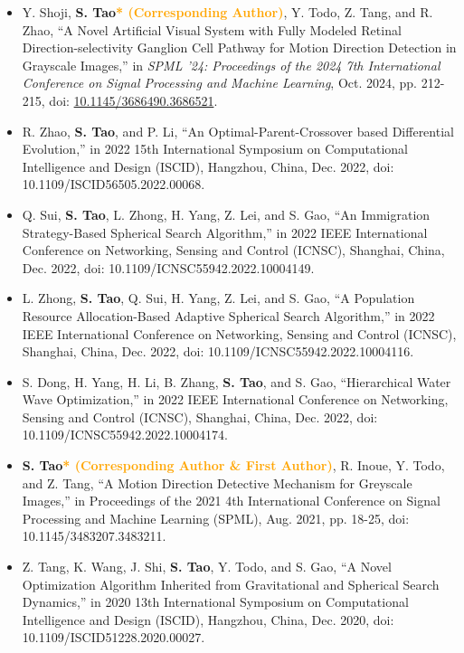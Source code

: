 \documentclass[11pt,a4paper,sans]{moderncv}
\begin{document}
{\begin{itemize}[label=\textbullet]
      \item [10)] Y. Shoji, \textbf{S. Tao\textcolor{orange}{* (Corresponding Author)}}, Y. Todo, Z. Tang, and R. Zhao, “A Novel Artificial Visual System with Fully Modeled Retinal Direction-selectivity Ganglion Cell Pathway for Motion Direction Detection in Grayscale Images,” in \textit{SPML '24: Proceedings of the 2024 7th International Conference on Signal Processing and Machine Learning}, Oct. 2024, pp. 212-215, doi: \href{https://doi.org/10.1145/3686490.3686521}{10.1145/3686490.3686521}.
      
      \item [9)] R. Zhao, \textbf{S. Tao}, and P. Li, “An Optimal-Parent-Crossover based Differential Evolution,” in 2022 15th International Symposium on Computational Intelligence and Design (ISCID), Hangzhou, China, Dec. 2022, doi: 10.1109/ISCID56505.2022.00068.
      
      \item [8)] Q. Sui, \textbf{S. Tao}, L. Zhong, H. Yang, Z. Lei, and S. Gao, “An Immigration Strategy-Based Spherical Search Algorithm,” in 2022 IEEE International Conference on Networking, Sensing and Control (ICNSC), Shanghai, China, Dec. 2022, doi: 10.1109/ICNSC55942.2022.10004149.
      
      \item [7)] L. Zhong, \textbf{S. Tao}, Q. Sui, H. Yang, Z. Lei, and S. Gao, “A Population Resource Allocation-Based Adaptive Spherical Search Algorithm,” in 2022 IEEE International Conference on Networking, Sensing and Control (ICNSC), Shanghai, China, Dec. 2022, doi: 10.1109/ICNSC55942.2022.10004116.
      
      \item [6)] S. Dong, H. Yang, H. Li, B. Zhang, \textbf{S. Tao}, and S. Gao, “Hierarchical Water Wave Optimization,” in 2022 IEEE International Conference on Networking, Sensing and Control (ICNSC), Shanghai, China, Dec. 2022, doi: 10.1109/ICNSC55942.2022.10004174.
      
      \item [5)] \textbf{S. Tao\textcolor{orange}{* (Corresponding Author \& First Author)}}, R. Inoue, Y. Todo, and Z. Tang, “A Motion Direction Detective Mechanism for Greyscale Images,” in Proceedings of the 2021 4th International Conference on Signal Processing and Machine Learning (SPML), Aug. 2021, pp. 18-25, doi: 10.1145/3483207.3483211.
      
      \item [4)] Z. Tang, K. Wang, J. Shi, \textbf{S. Tao}, Y. Todo, and S. Gao, “A Novel Optimization Algorithm Inherited from Gravitational and Spherical Search Dynamics,” in 2020 13th International Symposium on Computational Intelligence and Design (ISCID), Hangzhou, China, Dec. 2020, doi: 10.1109/ISCID51228.2020.00027.
      

\end{itemize}}
\end{document}
